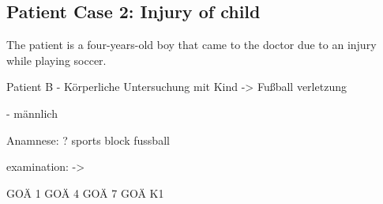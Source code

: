 \subsection{Patient Case 2: Injury of child}\label{subsec:patient-case-2:-anesthesia-for-birth}
The patient is a four-years-old boy that came to the doctor due to an injury while playing soccer.

Patient B - Körperliche Untersuchung mit Kind -> Fußball verletzung


- männlich


Anamnese:
? sports block fussball

examination:
->

GOÄ 1
GOÄ 4
GOÄ 7
GOÄ K1
